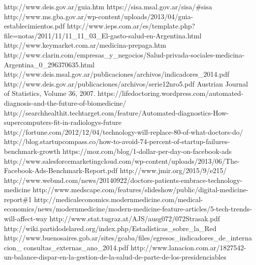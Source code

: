 \documentclass[a4paper,10pt]{article}
\begin{document}
\begin{thebibliography}{23}%
 http://www.deis.gov.ar/guia.htm 
 https://sisa.msal.gov.ar/sisa/\#sisa 
 http://www.ms.gba.gov.ar/wp-content/uploads/2013/04/guia-establecimientos.pdf
 http://www.ieps.com.ar/es/template.php?file=notas/2011/11/11\_11\_03\_El-gasto-salud-en-Argentina.html
 http://www.keymarket.com.ar/medicina-prepaga.htm
 http://www.clarin.com/empresas\_y\_negocios/Salud-privada-sociales-medicina-Argentina\_0\_296370635.html
 http://www.deis.msal.gov.ar/publicaciones/archivos/indicadores\_2014.pdf 
 http://www.deis.gov.ar/publicaciones/archivos/serie12nro5.pdf 
 Austrian Journal of Statistics, Volume 36, 2007.
 https://lifedoctoring.wordpress.com/automated-diagnosis-and-the-future-of-biomedicine/
 http://searchhealthit.techtarget.com/feature/Automated-diagnostics-How-supercomputers-fit-in-radiologys-future
 http://fortune.com/2012/12/04/technology-will-replace-80-of-what-doctors-do/
 http://blog.startupcompass.co/how-to-avoid-74-percent-of-startup-failures-benchmark-growth
 https://moz.com/blog/1-dollar-per-day-on-facebook-ads
 http://www.salesforcemarketingcloud.com/wp-content/uploads/2013/06/The-Facebook-Ads-Benchmark-Report.pdf
 http://www.jmir.org/2015/9/e215/ 
 http://www.webmd.com/news/20140922/doctors-patients-embrace-technology-medicine
 http://www.medscape.com/features/slideshow/public/digital-medicine-report\#1
 http://medicaleconomics.modernmedicine.com/medical-economics/news/modernmedicine/modern-medicine-feature-articles/5-tech-trends-will-affect-way
 http://www.stat.tugraz.at/AJS/ausg072/072Strasak.pdf
 http://wiki.partidodelared.org/index.php/Estadísticas\_sobre\_la\_Red
 http://www.buenosaires.gob.ar/sites/gcaba/files/egresos\_indicadores\_de\_internacion\_ consultas\_externas\_ano\_2014.pdf
 http://www.lanacion.com.ar/1827542-un-balance-dispar-en-la-gestion-de-la-salud-de-parte-de-los-presidenciables
\end{thebibliography}
\end{document}
